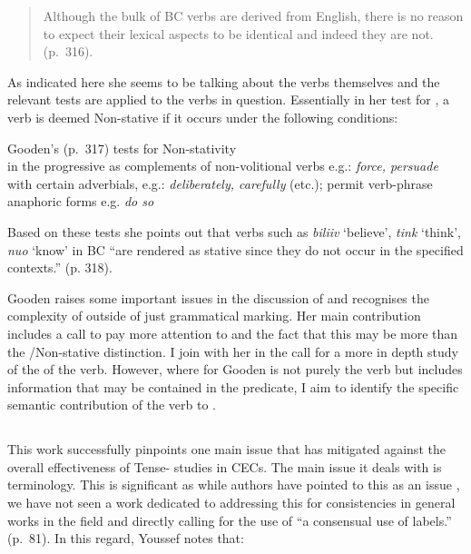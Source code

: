 \begin{quote}
Although the bulk of BC verbs are derived from English, there is no
reason to expect their lexical aspects to be identical and indeed they
are not.  (p.~316).
\end{quote}

As indicated here she seems to be talking about the verbs themselves
and the relevant tests are applied to the verbs in question.
Essentially in her test for , a verb is deemed Non-stative if
it occurs under the following conditions:

\ea%
\label{ex:2:24}
Gooden’s (p.~317) tests for Non-stativity \\
\ea in the progressive \ex as complements of non-volitional verbs
e.g.: \textit{force, persuade} \ex with certain adverbials, e.g.:
\textit{deliberately, carefully} (etc.); \ex permit verb-phrase
anaphoric forms e.g. \textit{do so} \citep{Mufwene1984} \z \z

Based on these tests she points out that verbs such as
\textit{biliiv} `believe', \textit{tink} `think', \textit{nuo}
`know' in BC “are rendered as stative since they do
not occur in the specified contexts.” (p.  318).

Gooden raises some important issues in the discussion of  and
recognises the complexity of  outside of just grammatical
marking.  Her main contribution includes a call to pay more attention
to  and the fact that this may be more than the
\slash Non-stative distinction.  I join with her in the call for a
more in depth study of the  of the verb.  However, where
for Gooden  is not purely the verb but includes
information that may be contained in the predicate, I aim to identify
the specific semantic contribution of the verb to .

\subsection{\citet{Youssef2003}}\label{sec:2.1.9}

This work successfully pinpoints one main issue that has mitigated
against the overall effectiveness of Tense- studies in CECs.
The main issue it deals with is terminology.  This is significant as
while authors have pointed to this as an issue \citep{Winford1993,Winford2001},
we have not seen a work dedicated to addressing this for
consistencies in general works in the field and directly calling for
the use of ``a consensual use of labels.” (p.~81).  In this regard,
Youssef notes that:

